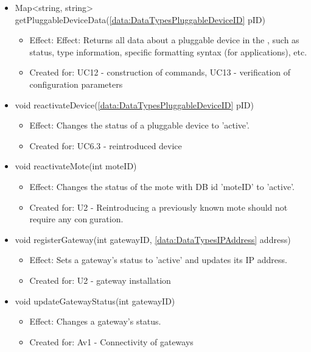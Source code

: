 \begin{description}
\begin{itemize}[noitemsep,nolistsep,leftmargin=-.25cm]
\begin{itemize}
        \end{itemize}
      \item \textsf{Map\textless{}string, string\textgreater{} getPluggableDeviceData(\ref{data:DataTypesPluggableDeviceID} pID)}
        \begin{itemize}[noitemsep,nolistsep]
           \item Effect: Effect: Returns all data about a pluggable device in the , such as status, type information, specific formatting syntax (for applications), etc.
\item Created for: UC12 - construction of commands, UC13 - verification of configuration parameters
        \end{itemize}
      \item \textsf{void reactivateDevice(\ref{data:DataTypesPluggableDeviceID} pID)}
        \begin{itemize}[noitemsep,nolistsep]
           \item Effect: Changes the status of a pluggable device to 'active'.
\item Created for: UC6.3 - reintroduced device
        \end{itemize}
      \item \textsf{void reactivateMote(int moteID)}
        \begin{itemize}[noitemsep,nolistsep]
           \item Effect: Changes the status of the mote with DB id 'moteID' to 'active'.
\item Created for: U2 - Reintroducing a previously known mote should not require any conguration.
        \end{itemize}
      \item \textsf{void registerGateway(int gatewayID, \ref{data:DataTypesIPAddress} address)}
        \begin{itemize}[noitemsep,nolistsep]
           \item Effect: Sets a gateway's status to 'active' and updates its IP address.
\item Created for: U2 - gateway installation
        \end{itemize}
      \item \textsf{void updateGatewayStatus(int gatewayID)}
        \begin{itemize}[noitemsep,nolistsep]
           \item Effect: Changes a gateway's status.
\item Created for: Av1 - Connectivity of gateways
        \end{itemize}
    \end{itemize}
    \end{description}

